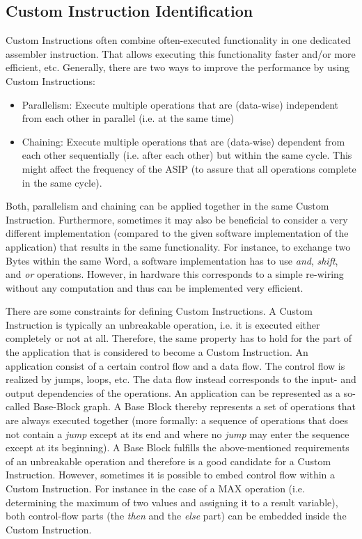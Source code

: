 \documentclass[
]{article}
\begin{document}
\hypertarget{custom-instruction-identification}{%
\subsection{Custom Instruction
Identification}\label{custom-instruction-identification}}

Custom Instructions often combine often-executed functionality in one
dedicated assembler instruction. That allows executing this
functionality faster and/or more efficient, etc. Generally, there are
two ways to improve the performance by using Custom Instructions:

\begin{itemize}
\item
  Parallelism: Execute multiple operations that are (data-wise)
  independent from each other in parallel (i.e. at the same time)
\item
  Chaining: Execute multiple operations that are (data-wise) dependent
  from each other sequentially (i.e. after each other) but within the
  same cycle. This might affect the frequency of the ASIP (to assure
  that all operations complete in the same cycle).
\end{itemize}

Both, parallelism and chaining can be applied together in the same
Custom Instruction. Furthermore, sometimes it may also be beneficial to
consider a very different implementation (compared to the given software
implementation of the application) that results in the same
functionality. For instance, to exchange two Bytes within the same Word,
a software implementation has to use \emph{and}, \emph{shift}, and
\emph{or} operations. However, in hardware this corresponds to a simple
re-wiring without any computation and thus can be implemented very
efficient.

There are some constraints for defining Custom Instructions. A Custom
Instruction is typically an unbreakable operation, i.e. it is executed
either completely or not at all. Therefore, the same property has to
hold for the part of the application that is considered to become a
Custom Instruction. An application consist of a certain control flow and
a data flow. The control flow is realized by jumps, loops, etc. The data
flow instead corresponds to the input- and output dependencies of the
operations. An application can be represented as a so-called Base-Block
graph. A Base Block thereby represents a set of operations that are
always executed together (more formally: a sequence of operations that
does not contain a \emph{jump} except at its end and where no
\emph{jump} may enter the sequence except at its beginning). A Base
Block fulfills the above-mentioned requirements of an unbreakable
operation and therefore is a good candidate for a Custom Instruction.
However, sometimes it is possible to embed control flow within a Custom
Instruction. For instance in the case of a MAX operation (i.e.
determining the maximum of two values and assigning it to a result
variable), both control-flow parts (the \emph{then} and the \emph{else}
part) can be embedded inside the Custom Instruction.
\end{document}
